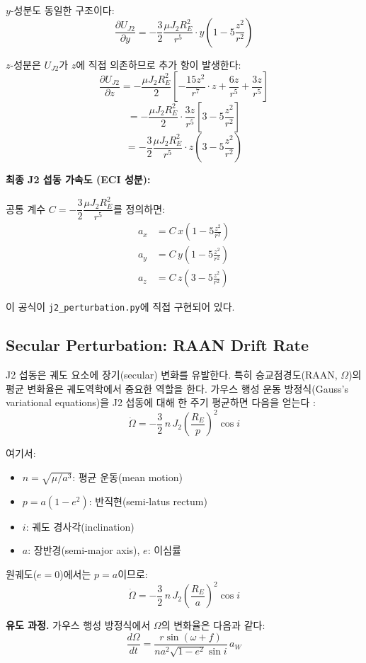 \documentclass[11pt]{article}
\begin{document}
$y$-성분도 동일한 구조이다:
\[
\frac{\partial U_{J2}}{\partial y} = -\frac{3}{2}\frac{\mu J_2 R_E^2}{r^5}\cdot y\left(1 - 5\frac{z^2}{r^2}\right)
\]

$z$-성분은 $U_{J2}$가 $z$에 직접 의존하므로 추가 항이 발생한다:
\[
\frac{\partial U_{J2}}{\partial z} = -\frac{\mu J_2 R_E^2}{2}\left[-\frac{15z^2}{r^7}\cdot z + \frac{6z}{r^5} + \frac{3z}{r^5}\right]
\]
\[
= -\frac{\mu J_2 R_E^2}{2}\cdot\frac{3z}{r^5}\left[3 - 5\frac{z^2}{r^2}\right]
\]
\[
= -\frac{3}{2}\frac{\mu J_2 R_E^2}{r^5}\cdot z\left(3 - 5\frac{z^2}{r^2}\right)
\]

\textbf{최종 J2 섭동 가속도 (ECI 성분):}

공통 계수 $C = -\dfrac{3}{2}\dfrac{\mu J_2 R_E^2}{r^5}$를 정의하면:
\[
\boxed{
\begin{aligned}
a_x &= C\,x\left(1 - 5\frac{z^2}{r^2}\right) \\[6pt]
a_y &= C\,y\left(1 - 5\frac{z^2}{r^2}\right) \\[6pt]
a_z &= C\,z\left(3 - 5\frac{z^2}{r^2}\right)
\end{aligned}
}
\]

이 공식이 \texttt{j2\_perturbation.py}에 직접 구현되어 있다.


\subsection{Secular Perturbation: RAAN Drift Rate}

J2 섭동은 궤도 요소에 장기(secular) 변화를 유발한다. 특히 승교점경도(RAAN, $\Omega$)의 평균 변화율은 궤도역학에서 중요한 역할을 한다. 가우스 행성 운동 방정식(Gauss's variational equations)을 J2 섭동에 대해 한 주기 평균하면 다음을 얻는다 \cite{Vallado2013}:
\[
\dot{\Omega} = -\frac{3}{2}\,n\,J_2\left(\frac{R_E}{p}\right)^2 \cos i
\]

여기서:
\begin{itemize}
  \item $n = \sqrt{\mu/a^3}$: 평균 운동(mean motion)
  \item $p = a(1 - e^2)$: 반직현(semi-latus rectum)
  \item $i$: 궤도 경사각(inclination)
  \item $a$: 장반경(semi-major axis), $e$: 이심률
\end{itemize}

원궤도($e = 0$)에서는 $p = a$이므로:
\[
\dot{\Omega} = -\frac{3}{2}\,n\,J_2\left(\frac{R_E}{a}\right)^2 \cos i
\]

\textbf{유도 과정.} 가우스 행성 방정식에서 $\Omega$의 변화율은 다음과 같다:
\[
\frac{d\Omega}{dt} = \frac{r\sin(\omega + f)}{n a^2 \sqrt{1-e^2}\sin i}\,a_W
\]
\end{document}
